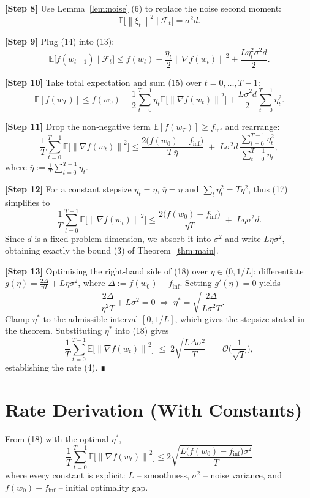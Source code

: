 \documentclass[11pt]{article}
\newcommand{\EE}{\mathbb{E}}
\newcommand{\norm}[1]{\left\lVert #1 \right\rVert}
\begin{document}
\noindent\textbf{[Step 8]} Use Lemma~\ref{lem:noise} (6) to replace the noise
second moment:
\[
\EE\!\big[\norm{\xi_t}^{2}\mid\mathcal F_t\big]=\sigma^{2}d .
\tag{14}
\]

\noindent\textbf{[Step 9]} Plug (14) into (13):
\[
\EE\!\big[f(w_{t+1})\mid\mathcal F_t\big]
\le f(w_t)
-\frac{\eta_t}{2}\norm{\nabla f(w_t)}^{2}
+\frac{L\eta_t^{2}\sigma^{2}d}{2}.
\tag{15}
\]

\noindent\textbf{[Step 10]} Take total expectation and sum (15) over
$t=0,\dots,T-1$:
\[
\EE[f(w_T)]\le f(w_0)
-\frac{1}{2}\sum_{t=0}^{T-1}\eta_t
\EE\!\big[\norm{\nabla f(w_t)}^{2}\big]
+\frac{L\sigma^{2}d}{2}\sum_{t=0}^{T-1}\eta_t^{2}.
\tag{16}
\]

\noindent\textbf{[Step 11]} Drop the non‑negative term $\EE[f(w_T)]\ge f_{\inf}$
and rearrange:
\[
\frac{1}{T}\sum_{t=0}^{T-1}
\EE\!\big[\norm{\nabla f(w_t)}^{2}\big]
\le
\frac{2\big(f(w_0)-f_{\inf}\big)}{T\,\bar\eta}
\;+\;
L\sigma^{2}d\,\frac{\sum_{t=0}^{T-1}\eta_t^{2}}
{\sum_{t=0}^{T-1}\eta_t},
\tag{17}
\]
where $\bar\eta:=\frac{1}{T}\sum_{t=0}^{T-1}\eta_t$.

\noindent\textbf{[Step 12]} For a constant stepsize $\eta_t=\eta$,
$\bar\eta=\eta$ and $\sum_{t}\eta_t^{2}=T\eta^{2}$, thus (17) simplifies to
\[
\frac{1}{T}\sum_{t=0}^{T-1}
\EE\!\big[\norm{\nabla f(w_t)}^{2}\big]
\le
\frac{2\big(f(w_0)-f_{\inf}\big)}{\eta T}
\;+\;L\eta\sigma^{2}d .
\tag{18}
\]
Since $d$ is a fixed problem dimension, we absorb it into $\sigma^{2}$
and write $L\eta\sigma^{2}$, obtaining exactly the bound (3) of
Theorem~\ref{thm:main}.

\noindent\textbf{[Step 13]} Optimising the right‑hand side of (18) over
$\eta\in(0,1/L]$:
differentiate $g(\eta)=\frac{2\Delta}{\eta T}+L\eta\sigma^{2}$,
where $\Delta:=f(w_0)-f_{\inf}$.
Setting $g'(\eta)=0$ yields
\[
-\frac{2\Delta}{\eta^{2}T}+L\sigma^{2}=0
\;\Longrightarrow\;
\eta^{*}= \sqrt{\frac{2\Delta}{L\sigma^{2}T}} .
\tag{19}
\]
Clamp $\eta^{*}$ to the admissible interval $[0,1/L]$, which gives the
stepsize stated in the theorem. Substituting $\eta^{*}$ into (18) gives
\[
\frac{1}{T}\sum_{t=0}^{T-1}
\EE\!\big[\norm{\nabla f(w_t)}^{2}\big]
\;\le\;
2\sqrt{\frac{L\Delta\sigma^{2}}{T}}
\;=\; \mathcal O\!\Big(\frac{1}{\sqrt{T}}\Big),
\]
establishing the rate (4). ∎

\section*{Rate Derivation (With Constants)}
From (18) with the optimal $\eta^{*}$,
\[
\boxed{
\frac{1}{T}\sum_{t=0}^{T-1}
\EE\!\big[\norm{\nabla f(w_t)}^{2}\big]
\le
2\sqrt{\frac{L\big(f(w_0)-f_{\inf}\big)\sigma^{2}}{T}}
}
\tag{20}
\]
where every constant is explicit:
$L$ – smoothness, $\sigma^{2}$ – noise variance, and
$f(w_0)-f_{\inf}$ – initial optimality gap.
\end{document}
